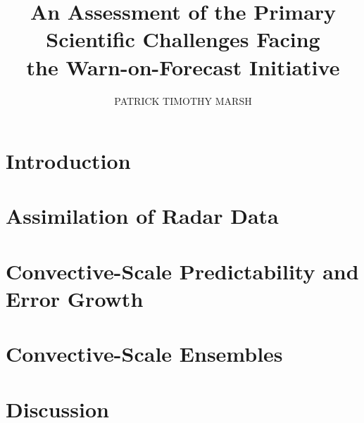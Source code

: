 \documentclass[12pt, generalexam]{generalexam} %
\begin{document}
\title{An Assessment of the Primary Scientific Challenges Facing\\the Warn-on-Forecast Initiative}
\author{PATRICK TIMOTHY MARSH}

\begin{preface}

\tableofcontents
\listoffigures

\doublespacing
{}
\label{sproblem}



% 


\label{acknowledgements}

\end{preface}

\doublespacing

\chapter{Introduction}
\label{introduction}



\chapter{Assimilation of Radar Data}
\label{data_assimilation}



\chapter{Convective-Scale Predictability and Error Growth}
\label{predictability}



\chapter{Convective-Scale Ensembles}
\label{ensembles}



\chapter{Discussion}
\label{discussion}





\end{document}
